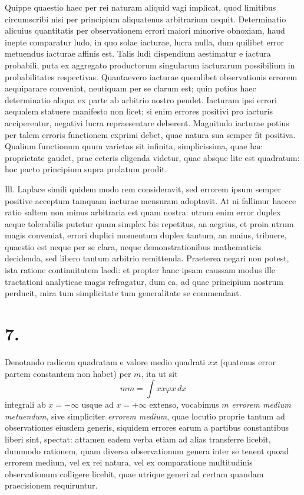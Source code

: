 \documentclass[12pt,a4paper]{book}
\begin{document}
Quippe quaestio haec per rei naturam aliquid vagi implicat, quod limitibus circumscribi nisi per principium aliquatenus arbitrarium nequit. Determinatio alicuius quantitatis per observationem errori maiori minorive obnoxiam, haud inepte comparatur ludo, in quo solae iacturae, lucra nulla, dum quilibet error metuendus iacturae affinis est. Talis ludi dispendium aestimatur e iactura probabili, puta ex aggregato productorum singularum iacturarum possibilium in probabilitates respectivas. Quantaevero iacturae quemlibet observationis errorem aequiparare conveniat, neutiquam per se clarum est; quin potius haec determinatio aliqua ex parte ab arbitrio nostro pendet. Iacturam ipsi errori aequalem statuere manifesto non licet; si enim errores positivi pro iacturis acciperentur, negativi lucra repraesentare deberent. Magnitudo iacturae potius per talem erroris functionem exprimi debet, quae natura sua semper fit positiva. Qualium functionum quum varietas sit infinita, simplicissima, quae hac proprietate gaudet, prae ceteris eligenda videtur, quae absque lite est quadratum: hoc pacto principium supra prolatum prodit.

Ill. Laplace simili quidem modo rem consideravit, sed errorem ipsum semper positive acceptum tamquam iacturae mensuram adoptavit. At ni fallimur haecce ratio saltem non minus arbitraria est quam nostra: utrum enim error duplex aeque tolerabilis putetur quam simplex bis repetitus, an aegrius, et proin utrum magis conveniat, errori duplici momentum duplex tantum, an maius, tribuere, quaestio est neque per se clara, neque demonstrationibus mathematicis decidenda, sed libero tantum arbitrio remittenda. Praeterea negari non potest, ista ratione continuitatem laedi: et propter hanc ipsam caussam modus ille tractationi analyticae magis refragatur, dum ea, ad quae principium nostrum perducit, mira tum simplicitate tum generalitate se commendant.

\section*{7.}
\label{sec:art7}

Denotando radicem quadratam e valore medio quadrati $xx$ (quatenus error partem constantem non habet) per $m$, ita ut sit
%
\begin{equation*}
mm = \int xx\varphi x\,dx
\end{equation*}
integrali ab $x=-\infty$ usque ad $x=+\infty$ extenso, vocabimus $m$ \textit{errorem medium metuendum}, sive simpliciter \textit{errorem medium}, quae locutio proprie tantum ad observationes eiusdem generis, siquidem errores earum a partibus constantibus liberi sint, spectat: attamen eadem verba etiam ad alias transferre licebit, dummodo rationem, quam diversa observationum genera inter se tenent quoad errorem medium, vel ex rei natura, vel ex comparatione multitudinis observationum colligere licebit, quae utrique generi ad certam quandam praecisionem requiruntur.
\end{document}
